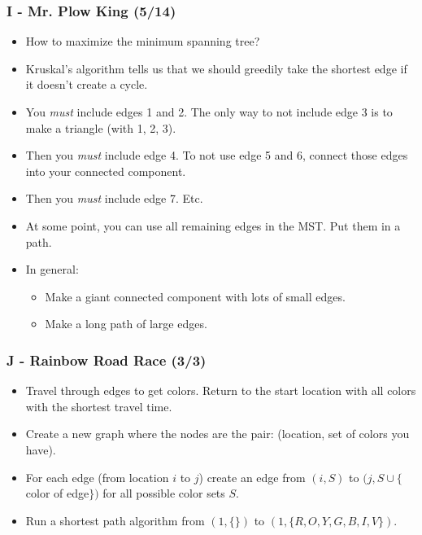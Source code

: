 \documentclass{beamer}
\begin{document}
\begin{frame}
\frametitle{I - Mr. Plow King (5/14)}
\begin{itemize}
\setlength\itemsep{0.3\baselineskip}
\item How to maximize the minimum spanning tree?
\item Kruskal's algorithm tells us that we should greedily take the shortest edge if it doesn't create a cycle.
\item You \textit{must} include edges 1 and 2. The only way to not include edge 3 is to make a triangle (with 1, 2, 3).
\item Then you \textit{must} include edge 4. To not use edge 5 and 6, connect those edges into your connected component.
\item Then you \textit{must} include edge 7. Etc.
\item At some point, you can use all remaining edges in the MST. Put them in a path.
\item In general:
  \begin{itemize}
   \item Make a giant connected component with lots of small edges.
   \item Make a long path of large edges.
  \end{itemize}
\end{itemize}
\end{frame}


\begin{frame}
\frametitle{J - Rainbow Road Race (3/3)}
\begin{itemize}
\setlength\itemsep{0.5\baselineskip}
\item Travel through edges to get colors. Return to the start location with all colors with the shortest travel time.
\item Create a new graph where the nodes are the pair: (location, set of colors you have).
\item For each edge (from location $i$ to $j$) create an edge from $(i, S)$ to $(j, S \cup \{$color of edge$ \})$ for all possible color sets $S$.
\item Run a shortest path algorithm from $(1, \{ \})$ to $(1, \{ R,O,Y,G,B,I,V \} )$.
\end{itemize}
\end{frame}
\end{document}

